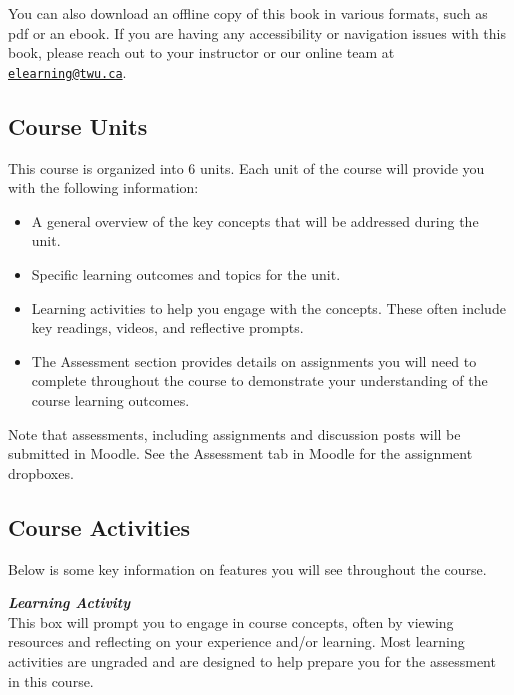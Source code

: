 \documentclass[
]{book}
\providecommand{\tightlist}{%
  \setlength{\itemsep}{0pt}\setlength{\parskip}{0pt}}
\begin{document}
You can also download an offline copy of this book in various formats, such as pdf or an ebook. If you are having any accessibility or navigation issues with this book, please reach out to your instructor or our online team at \href{mailto:elearning@twu.ca}{\nolinkurl{elearning@twu.ca}}.

\hypertarget{course-units}{%
\subsection*{Course Units}\label{course-units}}

This course is organized into 6 units. Each unit of the course will provide you with the following information:

\begin{itemize}
\tightlist
\item
  A general overview of the key concepts that will be addressed during the unit.\\
\item
  Specific learning outcomes and topics for the unit.\\
\item
  Learning activities to help you engage with the concepts. These often include key readings, videos, and reflective prompts.\\
\item
  The Assessment section provides details on assignments you will need to complete throughout the course to demonstrate your understanding of the course learning outcomes.
\end{itemize}

\begin{caution}
Note that assessments, including assignments and discussion posts will be submitted in Moodle. See the Assessment tab in Moodle for the assignment dropboxes.
\end{caution}

\hypertarget{course-activities}{%
\subsection*{Course Activities}\label{course-activities}}

Below is some key information on features you will see throughout the course.~

\begin{reflect}
\textbf{\emph{Learning Activity}}\\
This box will prompt you to engage in course concepts, often by viewing resources and reflecting on your experience and/or learning. Most learning activities are ungraded and are designed to help prepare you for the assessment in this course.
\end{reflect}
\end{document}
